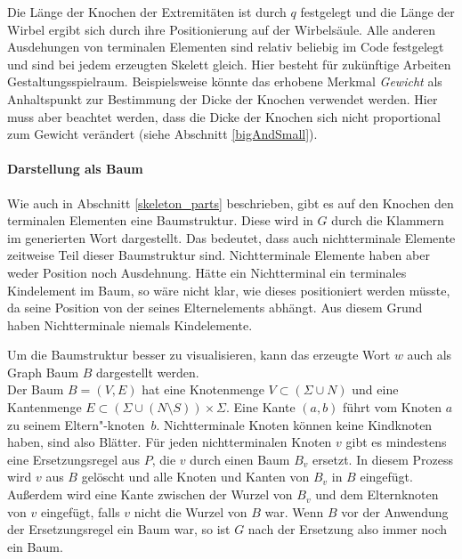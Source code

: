 Die Länge der Knochen der Extremitäten ist durch $q$ festgelegt und die Länge der Wirbel ergibt sich durch ihre Positionierung auf der Wirbelsäule. Alle anderen Ausdehungen von terminalen Elementen sind relativ beliebig im Code festgelegt und sind bei jedem erzeugten Skelett gleich. Hier besteht für zukünftige Arbeiten Gestaltungsspielraum. Beispielsweise könnte das erhobene Merkmal \emph{Gewicht} als Anhaltspunkt zur Bestimmung der Dicke der Knochen verwendet werden. Hier muss aber beachtet werden, dass die Dicke der Knochen sich nicht proportional zum Gewicht verändert (siehe Abschnitt \ref{bigAndSmall}). 


\paragraph{Darstellung als Baum}
Wie auch in Abschnitt \ref{skeleton_parts} beschrieben, gibt es auf den Knochen \bzw den terminalen Elementen eine Baumstruktur. Diese wird in $G$ durch die Klammern im generierten Wort dargestellt. Das bedeutet, dass auch nichtterminale Elemente zeitweise Teil dieser Baumstruktur sind.
Nichtterminale Elemente haben aber weder Position noch Ausdehnung.
Hätte ein Nichtterminal ein terminales Kindelement im Baum, so wäre nicht klar, wie dieses positioniert werden müsste, da seine Position von der seines Elternelements abhängt.
Aus diesem Grund haben Nichtterminale niemals Kindelemente.

Um die Baumstruktur besser zu visualisieren, kann das erzeugte Wort $w$ auch als Graph \bzw Baum $B$ dargestellt werden.\\
Der Baum $B = (V, E)$ hat eine Knotenmenge $V \subset (\Sigma \cup N)$ und eine Kantenmenge $E \subset (\Sigma \cup (N \setminus S)) \times \Sigma$. Eine Kante $(a, b)$ führt vom Knoten $a$ zu seinem Eltern"-\mbox{knoten $b$}. Nichtterminale Knoten können keine Kindknoten haben, sind also Blätter. Für jeden nichtterminalen Knoten $v$ gibt es mindestens eine Ersetzungsregel aus $P$, die $v$ durch einen Baum $B_v$ ersetzt. In diesem Prozess wird $v$ aus $B$ gelöscht und alle Knoten und Kanten von $B_v$ in $B$ eingefügt. Außerdem wird eine Kante zwischen der Wurzel von $B_v$ und dem Elternknoten von $v$ eingefügt, falls $v$ nicht die Wurzel von $B$ war. Wenn $B$ vor der Anwendung der Ersetzungsregel ein Baum war, so ist $G$ nach der Ersetzung also immer noch ein Baum.

